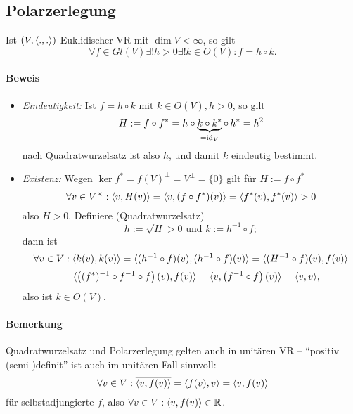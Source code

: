 \subsection{Polarzerlegung}
\begin{Satz}[Polarzerlegung]
	Ist $ (V,\langle .,. \rangle) $ Euklidischer VR mit $ \dim V <\infty $, so gilt
		\[ \forall f\in Gl(V) \exists! h > 0 \exists! k\in O(V) : f = h\circ k. \]
\end{Satz}
\paragraph{Beweis}
	
	\begin{itemize}
		\item \emph{Eindeutigkeit:\quad} Ist $ f=h\circ k $ mit $ k\in O(V), h>0 $, so gilt
		\[ H:= f\circ f^* = h\circ \underbrace{k \circ k^*}_{=\operatorname{id}_V} \circ\, h^* = h^2 \]
		nach Quadratwurzelsatz ist also $ h $, und damit $ k $ eindeutig bestimmt.
		\item \emph{Existenz:\quad} Wegen $ \ker f^* = f(V)^\perp = V^\perp = \{0\} $ gilt für $ H:= f\circ f^* $
			\[ \forall v\in V^\times: \langle v,H(v) \rangle = \langle v,(f\circ f^*)(v) \rangle = \langle f^*(v),f^*(v) \rangle>0  \]
		also $ H>0 $. Definiere (Quadratwurzelsatz)
			\[ h:= \sqrt{H}>0 \text{ und } k:= h^{-1}\circ f; \]
		dann ist
			\[ \forall v\in V: \langle k(v),k(v) \rangle = \langle (h^{-1}\circ f)(v),(h^{-1}\circ f)(v) \rangle = \langle (H^{-1}\circ f)(v),f(v) \rangle \]
			\[= \langle \left((f^*)^{-1}\circ f^{-1}\circ f\right)(v),f(v) \rangle = \langle v,\left(f^{-1}\circ f\right)(v) \rangle = \langle v,v \rangle, \]
		also ist $ k\in O(V) $.
	\end{itemize}
\paragraph{Bemerkung}
	Quadratwurzelsatz und Polarzerlegung gelten auch in unitären VR -- "`positiv (semi-)definit"' ist auch im unitären Fall sinnvoll:
		\[ \forall v\in V: \overline{\langle v,f(v) \rangle} = \langle f(v),v \rangle=\langle v,f(v) \rangle \]
	für selbstadjungierte $ f $, also $ \forall v\in V: \langle v,f(v) \rangle\in \mathbb{R} $.